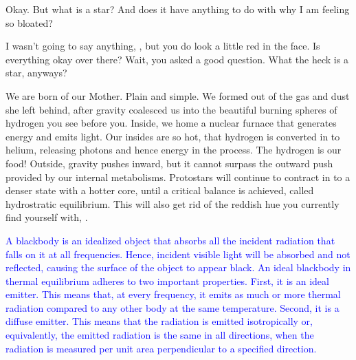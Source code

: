 \documentclass[main.tex]{subfiles}
\begin{document}
\par \Sterope Okay.  But what is a star?  And does it have anything to do with why I am feeling so bloated?

\par \Alcyone I wasn't going to say anything, \rmsterope, but you do look a little red in the face.  Is everything okay over there?  Wait, you asked a good question.  What the heck is a star, anyways?

\par \Maia We are born of our Mother.  Plain and simple.  We formed out of the gas and dust she left behind, after gravity coalesced us into the beautiful burning spheres of hydrogen you see before you.  Inside, we home a nuclear furnace that generates energy and emits light.  Our insides are so hot, that hydrogen is converted in to helium, releasing photons and hence energy in the process.  The hydrogen is our food!  Outside, gravity pushes inward, but it cannot surpass the outward push provided by our internal metabolisms.  Protostars will continue to contract in to a denser state with a hotter core, until a critical balance is achieved, called hydrostratic equilibrium.  This will also get rid of the reddish hue you currently find yourself with, \rmsterope.

\begin{tcolorbox}[sharp corners, colback=blue!30, colframe=blue!80!blue, title=Blackbody]
\par \textcolor{blue} {A blackbody is an idealized object that absorbs all the incident radiation that falls on it at all frequencies.  Hence, incident visible light will be absorbed and not reflected, causing the surface of the object to appear black.  An ideal blackbody in thermal equilibrium adheres to two important properties.  First, it is an ideal emitter.  This means that, at every frequency, it emits as much or more thermal radiation compared to any other body at the same temperature.  Second, it is a diffuse emitter.  This means that the radiation is emitted isotropically or, equivalently, the emitted radiation is the same in all directions, when the radiation is measured per unit area perpendicular to a specified direction.}
\end{tcolorbox}
\end{document}
